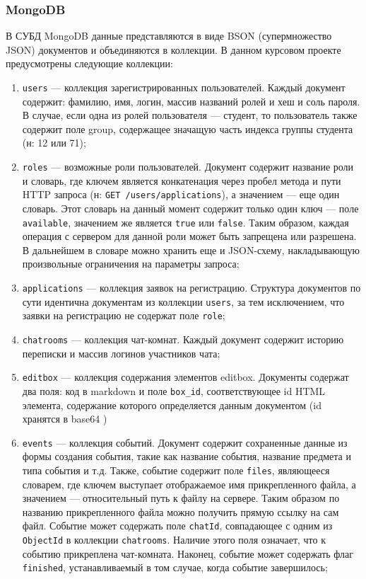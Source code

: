 \documentclass[14pt]{extarticle}
\begin{document}
\subsubsection{MongoDB}
В СУБД MongoDB данные представляются в виде BSON \cite{bson} (супермножество JSON) документов и объединяются в коллекции. В данном курсовом проекте предусмотрены следующие коллекции:
\begin{enumerate}
\item[] \texttt{users} --- коллекция зарегистрированных пользователей. Каждый документ содержит: фамилию, имя, логин, массив названий ролей и хеш и соль пароля. В случае, если одна из ролей пользователя --- студент, то пользователь также содержит поле group, содержащее значащую часть индекса группы студента (н: 12 или 71);
\item[] \texttt{roles} --- возможные роли пользователей. Документ содержит название роли и словарь, где ключем является конкатенация через пробел метода и пути HTTP запроса (н: \texttt{GET /users/applications}), а значением --- еще один словарь. Этот словарь на данный момент содержит только один ключ --- поле \texttt{available}, значением же является \texttt{true} или \texttt{false}. Таким образом, каждая операция с сервером для данной роли может быть запрещена или разрешена. В дальнейшем в словаре можно хранить еще и JSON-схему, накладывающую произвольные ограничения на параметры запроса;
\item[] \texttt{applications} --- коллекция заявок на регистрацию. Структура документов по сути идентична документам из коллекции \texttt{users}, за тем исключением, что заявки на регистрацию не содержат поле \texttt{role};
\item[] \texttt{chatrooms} --- коллекция чат-комнат. Каждый документ содержит историю переписки и массив логинов участников чата;
\item[] \texttt{editbox} --- коллекция содержания элементов editbox. Документы содержат два поля: код в markdown и поле \texttt{box\_id}, соответствующее id HTML элемента, содержание которого определяется данным документом (id хранятся в base64 \cite{base64})
\item[] \texttt{events} --- коллекция событий. Документ содержит сохраненные данные из формы создания события, такие как название события, название предмета и типа события и т.д. Также, событие содержит поле \texttt{files}, являющееся словарем, где ключем выступает отображаемое имя прикрепленного файла, а значением --- относительный путь к файлу на сервере. Таким образом по названию прикрепленного файла можно получить прямую ссылку на сам файл. Событие может содержать поле \texttt{chatId}, совпадающее с одним из \texttt{ObjectId} в коллекции \texttt{chatrooms}. Наличие этого поля означает, что к событию прикреплена чат-комната. Наконец, событие может содержать флаг \texttt{finished}, устанавливаемый в том случае, когда событие завершилось;

\end{enumerate}
\end{document}
